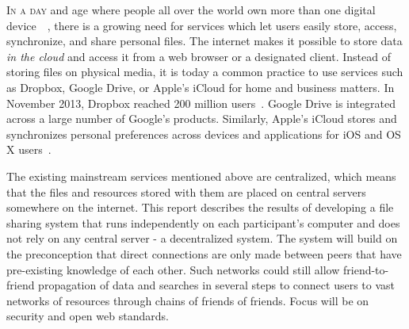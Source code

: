 \lettrine[lines=2, findent=2pt]{I}{n a day} and age where people all over the world own more than one digital device~\cite{OFCOMa:Online}~\cite{OFCOMb:Online}, there is a growing need for services which let users easily store, access, synchronize, and share personal files. The internet makes it possible to store data \emph{in the cloud} and access it from a web browser or a designated client. Instead of storing files on physical media, it is today a common practice to use services such as Dropbox, Google Drive, or Apple's iCloud for home and business matters. In November 2013, Dropbox reached 200 million users~\cite{Constine:2013:Online}. Google Drive is integrated across a large number of Google's products. Similarly, Apple's iCloud stores and synchronizes personal preferences across devices and applications for iOS and OS X users~\cite{CloudTrend:Online}.

The existing mainstream services mentioned above are centralized, which means that the files and resources stored with them are placed on central servers somewhere on the internet. This report describes the results of developing a file sharing system that runs independently on each participant's computer and does not rely on any central server - a decentralized system. The system will build on the preconception that direct connections are only made between peers that have pre-existing knowledge of each other. Such networks could still allow friend-to-friend propagation of data and searches in several steps to connect users to vast networks of resources through chains of friends of friends. Focus will be on security and open web standards.







